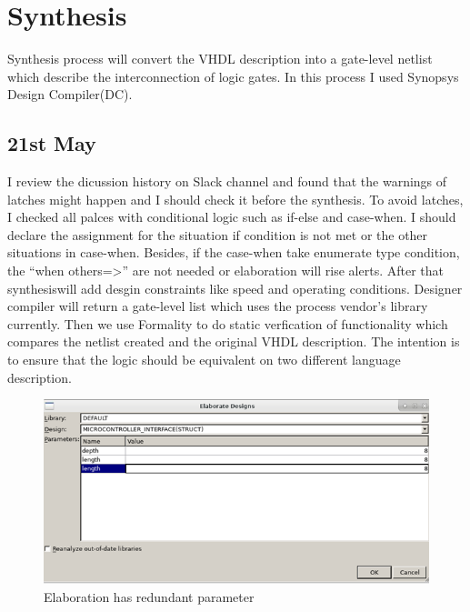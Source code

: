 \section{Synthesis}
Synthesis process will convert the VHDL description into a gate-level netlist which describe the interconnection of
logic gates. In this process I used Synopsys Design Compiler(DC). 
\subsection{21st May}
I review the dicussion history on Slack channel and found that the warnings of latches might happen and I should
check it before the synthesis. To avoid latches, I checked all palces with conditional logic such as if-else and case-when.
I should declare the assignment for the situation if condition is not met or the other situations in case-when. Besides, if the case-when
take enumerate type condition, the ``when others=>'' are not needed or elaboration will rise alerts.
After that synthesiswill add desgin constraints like speed and operating conditions. Designer compiler will return a gate-level list
which uses the process vendor's library currently. Then we use Formality to do static verfication of functionality which compares the 
netlist created and the original VHDL description. The intention is to ensure that the logic should be equivalent on two different language
description.

\begin{figure}[!h]
    \centerline{\includegraphics[width=15cm]{./Figures/elaboration.png}}
    \caption{Elaboration has redundant parameter \label{fig2} }
\end{figure}

